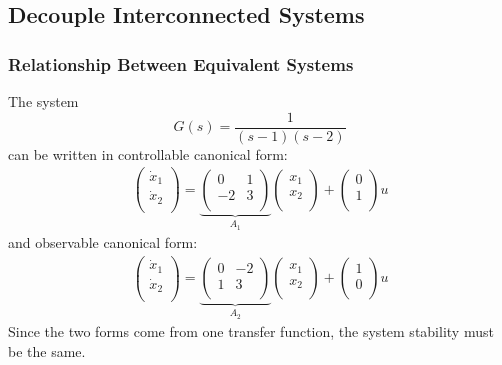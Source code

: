 \subsection{Decouple Interconnected Systems}
\subsubsection{Relationship Between Equivalent Systems}
The system \[G(s)=\frac{1}{(s-1)(s-2)}\] can be written in
controllable canonical form:
\begin{gather*}
\begin{pmatrix}
\dot{x}_{1}\\
\dot{x}_{2}\\
\end{pmatrix}
= \underbrace{\begin{pmatrix}
0 & 1\\
-2 &3 \\
\end{pmatrix}}_{A_{1}}
\begin{pmatrix}
x_{1}\\
x_{2}\\
\end{pmatrix}
+\begin{pmatrix}
0\\
1\\
\end{pmatrix} u
\end{gather*}
and observable canonical form:
\begin{gather*}
\begin{pmatrix}
\dot{x}_{1}\\
\dot{x}_{2}\\
\end{pmatrix}
= \underbrace{\begin{pmatrix}
0 & -2\\
1 &3 \\
\end{pmatrix}}_{A_{2}}
\begin{pmatrix}
x_{1}\\
x_{2}\\
\end{pmatrix}
+\begin{pmatrix}
1\\
0\\
\end{pmatrix}
u
\end{gather*}
Since the two forms come from one transfer function, the system stability must be the same.
